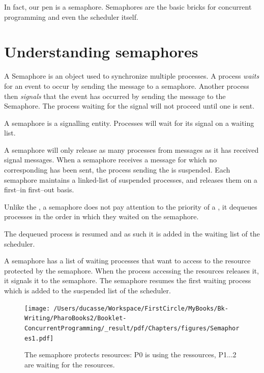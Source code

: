 \documentclass[10pt,twoside,english]{_support/latex/sbabook/sbabook}
\begin{document}
In fact, our pen is a semaphore. Semaphores are the basic bricks for concurrent programming and even the scheduler itself.
\section{Understanding semaphores}
A Semaphore is an object used to synchronize multiple processes.
A process \textit{waits} for an event to occur by sending the message  to a semaphore.
Another process then \textit{signals} that the event has occurred by sending the message  to the Semaphore.
The process waiting for the signal will not proceed until one is sent.

A semaphore is a signalling entity. 
Processes will wait for its signal on a waiting list. 

A semaphore will only release as many processes from  messages as it has received signal messages.
When a semaphore receives a  message for which no corresponding  has been sent, the process sending the  is suspended.
Each semaphore maintains a linked-list of suspended processes, and releases them on a first–in first–out basis.

Unlike the , a semaphore does not pay attention to the priority of a
, it dequeues processes in the order in which they waited on the semaphore.

The dequeued process is resumed and as such it is added in the waiting list of the scheduler.

A semaphore has a list of waiting processes that want to access to the resource protected by the semaphore. 
When the process accessing the resources releases it, it signals it to the semaphore. 
The semaphore resumes the first waiting process which is added to the suspended list of the scheduler.


\begin{figure}

\begin{center}
\texttt{[image: /Users/ducasse/Workspace/FirstCircle/MyBooks/Bk-Writing/PharoBooks2/Booklet-ConcurrentProgramming/\_result/pdf/Chapters/figures/Semaphores1.pdf]}\caption{The semaphore protects resources: P0 is using the ressources, P1...2 are waiting for the resources. \label{Sema1}}\end{center}
\end{figure}
\end{document}
